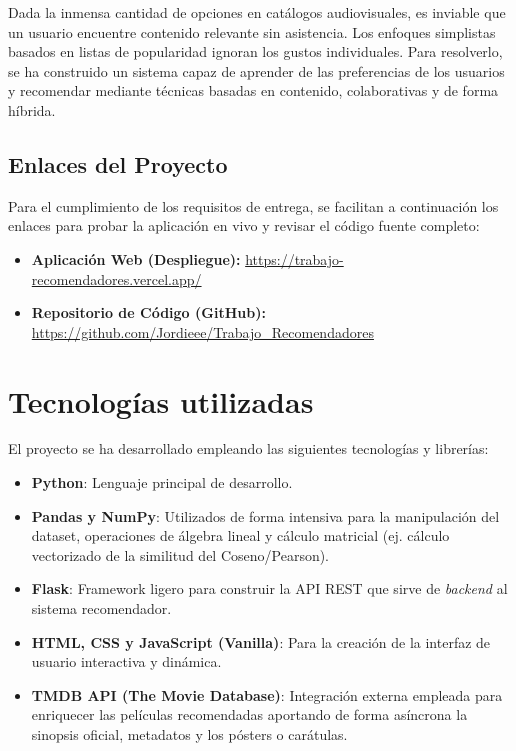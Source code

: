 \documentclass[12pt]{scrartcl}
\begin{document}
Dada la inmensa cantidad de opciones en catálogos audiovisuales, es inviable que un usuario encuentre contenido relevante sin asistencia. Los enfoques simplistas basados en listas de popularidad ignoran los gustos individuales. Para resolverlo, se ha construido un sistema capaz de aprender de las preferencias de los usuarios y recomendar mediante técnicas basadas en contenido, colaborativas y de forma híbrida.

\subsection{Enlaces del Proyecto}
Para el cumplimiento de los requisitos de entrega, se facilitan a continuación los enlaces para probar la aplicación en vivo y revisar el código fuente completo:
\begin{itemize}
    \item \textbf{Aplicación Web (Despliegue):} \url{https://trabajo-recomendadores.vercel.app/}
    \item \textbf{Repositorio de Código (GitHub):} \url{https://github.com/Jordieee/Trabajo_Recomendadores} %
\end{itemize}

\section{Tecnologías utilizadas}
El proyecto se ha desarrollado empleando las siguientes tecnologías y librerías:
\begin{itemize}
    \item \textbf{Python}: Lenguaje principal de desarrollo.
    \item \textbf{Pandas y NumPy}: Utilizados de forma intensiva para la manipulación del dataset, operaciones de álgebra lineal y cálculo matricial (ej. cálculo vectorizado de la similitud del Coseno/Pearson).
    \item \textbf{Flask}: Framework ligero para construir la API REST que sirve de \textit{backend} al sistema recomendador.
    \item \textbf{HTML, CSS y JavaScript (Vanilla)}: Para la creación de la interfaz de usuario interactiva y dinámica.
    \item \textbf{TMDB API (The Movie Database)}: Integración externa empleada para enriquecer las películas recomendadas aportando de forma asíncrona la sinopsis oficial, metadatos y los pósters o carátulas.
\end{itemize}
\end{document}
